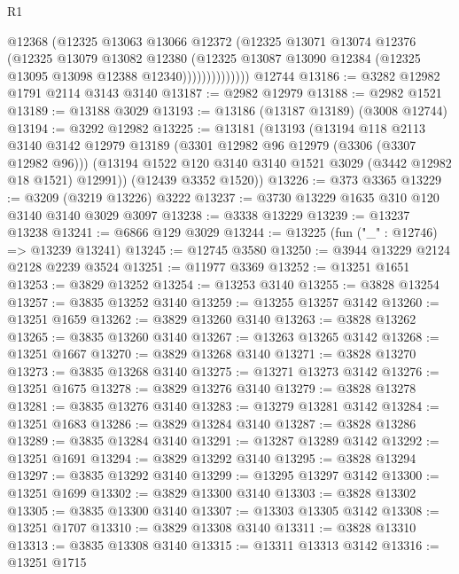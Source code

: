 \begin{lexlean}{R1}
\begin{coremodule}
                      @12368
                      (@12325
                        @13063
                        @13066
                        @12372
                        (@12325
                          @13071
                          @13074
                          @12376
                          (@12325
                            @13079
                            @13082
                            @12380
                            (@12325
                              @13087
                              @13090
                              @12384
                              (@12325 @13095 @13098 @12388 @12340))))))))))))))
    @12744
@13186 := @3282 @12982 @1791 @2114 @3143 @3140
@13187 := @2982 @12979
@13188 := @2982 @1521
@13189 := @13188 @3029
@13193 := @13186 (@13187 @13189) (@3008 @12744)
@13194 := @3292 @12982
@13225 := @13181
    (@13193
      (@13194
        @118
        @2113
        @3140
        @3142
        @12979
        @13189
        (@3301 @12982 @96 @12979 (@3306 (@3307 @12982 @96)))
        (@13194 @1522 @120 @3140 @3140 @1521 @3029 (@3442 @12982 @18 @1521) @12991))
      (@12439 @3352 @1520))
@13226 := @373 @3365
@13229 := @3209 (@3219 @13226) @3222
@13237 := @3730 @13229 @1635 @310 @120 @3140 @3140 @3029 @3097
@13238 := @3338 @13229
@13239 := @13237 @13238
@13241 := @6866 @129 @3029
@13244 := @13225 (fun ("_" : @12746) => @13239 @13241)
@13245 := @12745 @3580
@13250 := @3944 @13229 @2124 @2128 @2239 @3524
@13251 := @11977 @3369
@13252 := @13251 @1651
@13253 := @3829 @13252
@13254 := @13253 @3140
@13255 := @3828 @13254
@13257 := @3835 @13252 @3140
@13259 := @13255 @13257 @3142
@13260 := @13251 @1659
@13262 := @3829 @13260 @3140
@13263 := @3828 @13262
@13265 := @3835 @13260 @3140
@13267 := @13263 @13265 @3142
@13268 := @13251 @1667
@13270 := @3829 @13268 @3140
@13271 := @3828 @13270
@13273 := @3835 @13268 @3140
@13275 := @13271 @13273 @3142
@13276 := @13251 @1675
@13278 := @3829 @13276 @3140
@13279 := @3828 @13278
@13281 := @3835 @13276 @3140
@13283 := @13279 @13281 @3142
@13284 := @13251 @1683
@13286 := @3829 @13284 @3140
@13287 := @3828 @13286
@13289 := @3835 @13284 @3140
@13291 := @13287 @13289 @3142
@13292 := @13251 @1691
@13294 := @3829 @13292 @3140
@13295 := @3828 @13294
@13297 := @3835 @13292 @3140
@13299 := @13295 @13297 @3142
@13300 := @13251 @1699
@13302 := @3829 @13300 @3140
@13303 := @3828 @13302
@13305 := @3835 @13300 @3140
@13307 := @13303 @13305 @3142
@13308 := @13251 @1707
@13310 := @3829 @13308 @3140
@13311 := @3828 @13310
@13313 := @3835 @13308 @3140
@13315 := @13311 @13313 @3142
@13316 := @13251 @1715

\end{coremodule}
\end{lexlean}
